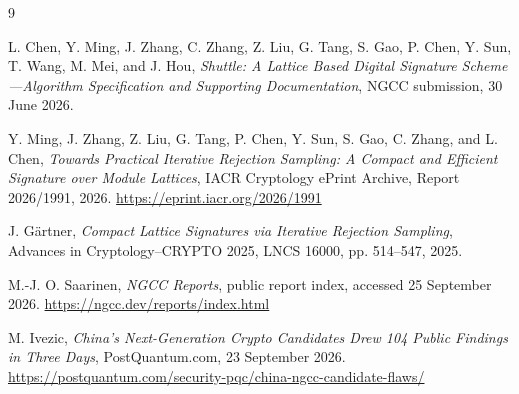 \documentclass[11pt,a4paper]{article}
\begin{document}
\begin{thebibliography}{9}

L. Chen, Y. Ming, J. Zhang, C. Zhang, Z. Liu, G. Tang, S. Gao, P. Chen,
Y. Sun, T. Wang, M. Mei, and J. Hou,
\emph{Shuttle: A Lattice Based Digital Signature Scheme---Algorithm
Specification and Supporting Documentation}, NGCC submission, 30 June 2026.

Y. Ming, J. Zhang, Z. Liu, G. Tang, P. Chen, Y. Sun, S. Gao, C. Zhang, and
L. Chen,
\emph{Towards Practical Iterative Rejection Sampling: A Compact and Efficient
Signature over Module Lattices}, IACR Cryptology ePrint Archive, Report
2026/1991, 2026.  \url{https://eprint.iacr.org/2026/1991}

J. G\"artner,
\emph{Compact Lattice Signatures via Iterative Rejection Sampling},
Advances in Cryptology--CRYPTO 2025, LNCS 16000, pp. 514--547, 2025.

M.-J. O. Saarinen,
\emph{NGCC Reports}, public report index, accessed 25 September 2026.
\url{https://ngcc.dev/reports/index.html}

M. Ivezic,
\emph{China's Next-Generation Crypto Candidates Drew 104 Public Findings in
Three Days}, PostQuantum.com, 23 September 2026.
\url{https://postquantum.com/security-pqc/china-ngcc-candidate-flaws/}

\end{thebibliography}
\end{document}

